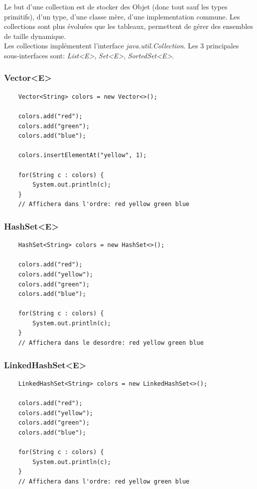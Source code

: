 \documentclass[a4paper, 12pt, french]{article}
\begin{document}
	Le but d'une collection est de stocker des Objet (donc tout sauf les types primitifs), d'un type, d'une classe mère, d'une implementation commune. Les collections sont plus évoluées que les tableaux, permettent de gérer des ensembles de taille dynamique.\\

	Les collections implémentent l'interface \emph{java.util.Collection}. Les 3 principales sous-interfaces sont: \emph{List<E>}, \emph{Set<E>}, \emph{SortedSet<E>}.

	\subsubsection{Vector<E>}

	\begin{lstlisting}
	Vector<String> colors = new Vector<>();

	colors.add("red");
	colors.add("green");
	colors.add("blue");

	colors.insertElementAt("yellow", 1);

	for(String c : colors) {
		System.out.println(c);
	}
	// Affichera dans l'ordre: red yellow green blue
	\end{lstlisting}

	\subsubsection{HashSet<E>}

	\begin{lstlisting}
	HashSet<String> colors = new HashSet<>();

	colors.add("red");
	colors.add("yellow");
	colors.add("green");
	colors.add("blue");

	for(String c : colors) {
		System.out.println(c);
	}
	// Affichera dans le desordre: red yellow green blue
	\end{lstlisting}

	\subsubsection{LinkedHashSet<E>}

	\begin{lstlisting}
	LinkedHashSet<String> colors = new LinkedHashSet<>();

	colors.add("red");
	colors.add("yellow");
	colors.add("green");
	colors.add("blue");

	for(String c : colors) {
		System.out.println(c);
	}
	// Affichera dans l'ordre: red yellow green blue
	\end{lstlisting}
\end{document}

